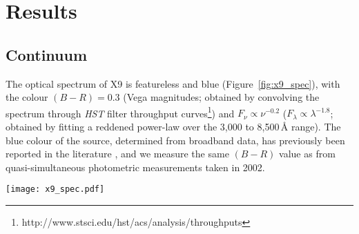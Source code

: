 \documentclass[a4paper,fleqn,usenatbib]{mnras}
\begin{document}
\section{Results}
 
\subsection{Continuum} 
 
The optical spectrum of X9 is featureless and blue (Figure~\ref{fig:x9_spec}), with the colour $(B - R) = 0.3$ (Vega magnitudes; obtained by convolving the spectrum through {\it HST} filter throughput curves\footnote{http://www.stsci.edu/hst/acs/analysis/throughputs}) and $F_\nu \propto \nu^{-0.2}$ ($F_\lambda \propto \lambda^{-1.8}$; obtained by fitting a reddened power-law over the 3,000 to 8,500\,{\AA} range). The blue colour of the source, determined from broadband data, has previously been reported in the literature \citep{1992Natur.360...46P, 2008ApJ...683.1006K}, and we measure the same $(B - R)$ value as \citet{2015MNRAS.453.3918M} from quasi-simultaneous photometric measurements taken in 2002.

\begin{figure*}
	\texttt{[image: x9\_spec.pdf]}
	\caption{{\it Top}: The smoothed optical spectrum of X9 (convolved with a Gaussian with FWHM = 7 pixels). We show only some of the error bars for clarity. {\it Bottom:} Zoomed-in regions of the non-smoothed spectrum. The vertical ticks above the spectrum indicate the wavelengths of the H\,$\alpha$ $\lambda$6564, H\,$\beta$ $\lambda$4862 and He\,{\sc ii} $\lambda$4687 lines (red ticks) typical of ordinary X-ray binaries, and the brightest C/N/O emission features (black ticks) in ultra-compact systems (with emission $\rm -EW >3$\,{\AA} in at least one of the three systems studied by \citealp{2004MNRAS.348L...7N}), which may be expected in X9. No obvious emission lines are visible. The upper limits on the EW (in emission and absorption) for these lines are listed in Table~\ref{tab:ew}.}
	\label{fig:x9_spec}
\end{figure*}
\end{document}
